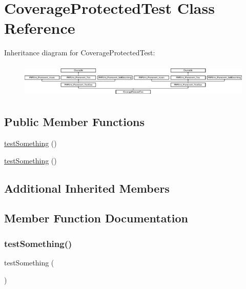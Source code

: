\hypertarget{class_coverage_protected_test}{}\section{Coverage\+Protected\+Test Class Reference}
\label{class_coverage_protected_test}
Inheritance diagram for Coverage\+Protected\+Test\+:\begin{figure}[H]
\begin{center}
\leavevmode
\includegraphics[height=1.651917cm]{class_coverage_protected_test}
\end{center}
\end{figure}
\subsection*{Public Member Functions}
\begin{DoxyCompactItemize}
\item 
\mbox{\hyperlink{class_coverage_protected_test_a0fc4e17369bc9607ebdd850d9eda8167}{test\+Something}} ()
\item 
\mbox{\hyperlink{class_coverage_protected_test_a0fc4e17369bc9607ebdd850d9eda8167}{test\+Something}} ()
\end{DoxyCompactItemize}
\subsection*{Additional Inherited Members}


\subsection{Member Function Documentation}
\mbox{\label{class_coverage_protected_test_a0fc4e17369bc9607ebdd850d9eda8167}} 
\subsubsection{\texorpdfstring{test\+Something()}{testSomething()}\hspace{0.1cm}{\footnotesize\ttfamily [1/2]}}
{\footnotesize\ttfamily test\+Something (\begin{DoxyParamCaption}{ }\end{DoxyParamCaption})}

